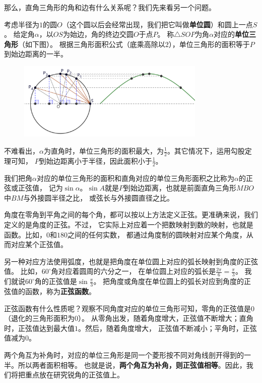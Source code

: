 \documentclass[12pt,UTF8]{ctexbook}
\begin{document}
那么，直角三角形的角和边有什么关系呢？我们先来看另一个问题。

考虑半径为$1$的圆$O$（这个圆以后会经常出现，我们把它叫做\textbf{单位圆}）和圆上一点$S$。
给定角$\alpha$，以$OS$为始边，角的终边交圆$O$于点$P$。
称$\triangle SOP$为角$\alpha$对应的\textbf{单位三角形}（如下图）。
根据三角形面积公式（底乘高除以$2$），单位三角形的面积等于$P$到始边距离的一半。

\begin{figure}[H] %
    \vspace{4pt}
    \centering
    \includegraphics[width=0.8\textwidth]{三角函数2.png}
\end{figure}

不难看出，$\alpha$为直角时，单位三角形的面积最大，为$\frac{1}{2}$。其它情况下，运用勾股定理可知，
$P$到始边距离小于半径，因此面积小于$\frac{1}{2}$。

我们把角$\alpha$对应的单位三角形的面积和直角对应的单位三角形面积之比称为$\alpha$的正弦或正弦值，
记为$\sin \alpha$。$\sin A$就是$P$到始边距离，也就是前面直角三角形$MBO$中$BM$与外接圆半径之比，
或弦长与外接圆直径之比。

角度在零角到平角之间的每个角，都可以按以上方法定义正弦。更准确来说，我们定义的是角度的正弦。不过，
它实际上对应着一个把数映射到数的映射，也就是函数。比如，$0$和$180$之间的任何实数，
都通过角度制的圆映射对应某个角度，从而对应某个正弦值。

另一种对应方法使用弧度，也就是把角度在单位圆上对应的弧长映射到角度的正弦值。
比如，$60^\circ$角对应着圆周的六分之一，
在单位圆上对应的弧长是$\frac{2\pi}{6} = \frac{\pi}{3}$。
我们就说$60^\circ$角的正弦值是$\sin \frac{\pi}{3}$。
把角度或角度在单位圆上的弧长对应到角度的正弦值的函数，称为\textbf{正弦函数}。

正弦函数有什么性质呢？观察不同角度对应的单位三角形可知，零角的正弦值是$0$（退化的三角形面积为$0$）。
从零角出发，随着角度增大，正弦值不断增大；直角时，正弦值达到最大值$1$。然后，随着角度增大，
正弦值不断减小；平角时，正弦值减为$0$。

两个角互为补角时，对应的单位三角形是同一个菱形按不同对角线剖开得到的一半。所以两者面积相等。
也就是说，\textbf{两个角互为补角，则正弦值相等}。因此，我们将把重点放在研究锐角的正弦值上。
\end{document}
